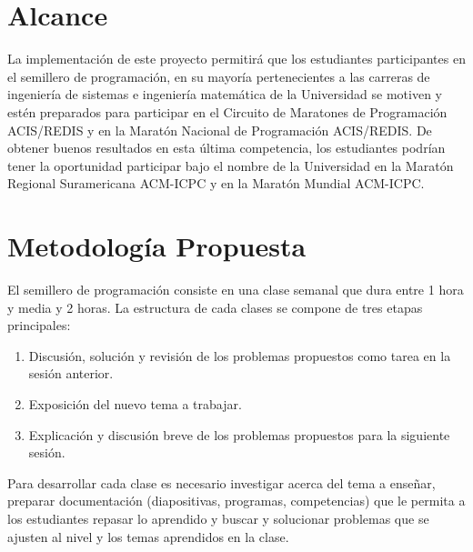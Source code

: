 \documentclass[11pt, oneside]{article}
\theoremstyle{definition}
\theoremstyle{remark}
\begin{document}
\section{Alcance}
La implementación de este proyecto permitirá que los estudiantes participantes en el semillero de programación, en su mayoría pertenecientes a las carreras de ingeniería de sistemas e ingeniería matemática de la Universidad se motiven y estén preparados para participar en el Circuito de Maratones de Programación ACIS/REDIS y en la Maratón Nacional de Programación ACIS/REDIS. De obtener buenos resultados en esta última competencia, los estudiantes podrían tener la oportunidad participar bajo el nombre de la Universidad en la Maratón Regional Suramericana ACM-ICPC y en la Maratón Mundial ACM-ICPC.

\section{Metodología Propuesta}
El semillero de programación consiste en una clase semanal que dura entre 1 hora y media y 2 horas. La estructura de cada clases se compone de tres etapas principales:
\begin{enumerate}
	\item{Discusión, solución y revisión de los problemas propuestos como tarea en la sesión anterior.}
	\item{Exposición del nuevo tema a trabajar.}
	\item{Explicación y discusión breve de los problemas propuestos para la siguiente sesión.}
\end{enumerate}
Para desarrollar cada clase es necesario investigar acerca del tema a enseñar, preparar documentación (diapositivas, programas, competencias) que le permita a los estudiantes repasar lo aprendido y buscar y solucionar problemas que se ajusten al nivel y los temas aprendidos en la clase.
\end{document}
